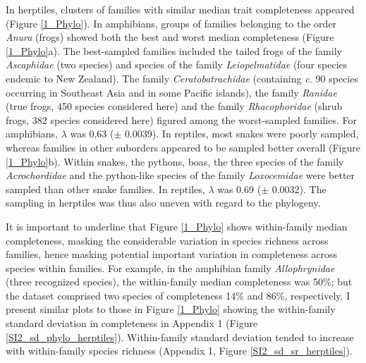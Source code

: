 In herptiles, clusters of families with similar median trait completeness appeared (Figure \ref{1_Phylo}). In amphibians, groups of families belonging to the order \textit{Anura} (frogs) showed both the best and worst median completeness (Figure \ref{1_Phylo}a). The best-sampled families included the tailed frogs of the family \textit{Ascaphidae} (two species) and species of the family \textit{Leiopelmatidae} (four species endemic to New Zealand). The family \textit{Ceratobatrachidae} (containing \textit{c.} 90 species occurring in Southeast Asia and in some Pacific islands), the family \textit{Ranidae} (true frogs, 450 species considered here) and the family \textit{Rhacophoridae} (shrub frogs, 382 species considered here) figured among the worst-sampled families. For amphibians, $\lambda$ was 0.63 ($\pm$ 0.0039). In reptiles, most snakes were poorly sampled, whereas families in other suborders appeared to be sampled better overall (Figure \ref{1_Phylo}b). Within snakes, the pythons, boas, the three species of the family \textit{Acrochordidae} and the python-like species of the family \textit{Loxocemidae} were better sampled than other snake families. In reptiles, $\lambda$ was 0.69 ($\pm$ 0.0032). The sampling in herptiles was thus also uneven with regard to the phylogeny.

It is important to underline that Figure \ref{1_Phylo} shows within-family median completeness, masking the considerable variation in species richness across families, hence masking potential important variation in completeness across species within families. For example, in the amphibian family \textit{Allophrynidae} (three recognized species), the within-family median completeness was 50\%; but the dataset comprised two species of completeness 14\% and 86\%, respectively. I present similar plots to those in Figure \ref{1_Phylo} showing the within-family standard deviation in completeness in Appendix 1 (Figure \ref{SI2_sd_phylo_herptiles}). Within-family standard deviation tended to increase with within-family species richness (Appendix 1, Figure \ref{SI2_sd_sr_herptiles}).

\clearpage

